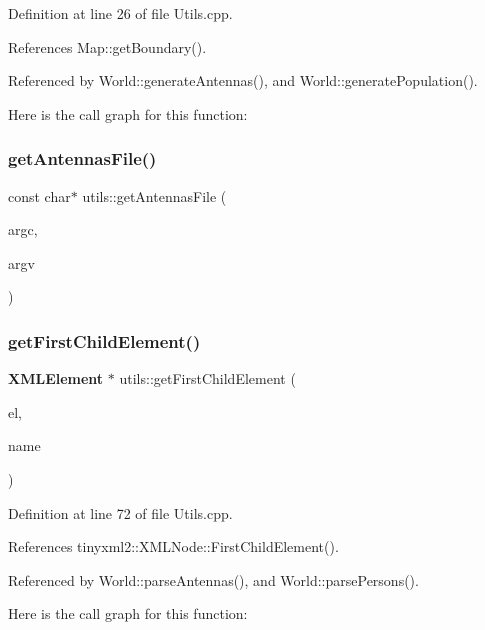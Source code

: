 Definition at line 26 of file Utils.\+cpp.



References Map\+::get\+Boundary().



Referenced by World\+::generate\+Antennas(), and World\+::generate\+Population().

Here is the call graph for this function\+:
\mbox{\label{namespaceutils_a20d2148f668eec93d623536d18c7dd62}} 
\subsubsection{get\+Antennas\+File()}
{\footnotesize\ttfamily const char$\ast$ utils\+::get\+Antennas\+File (\begin{DoxyParamCaption}\item[{int}]{argc,  }\item[{char $\ast$$\ast$}]{argv }\end{DoxyParamCaption})}

\mbox{\label{namespaceutils_a6d3da5ad06700408fa8e41f3115e4c40}} 
\subsubsection{get\+First\+Child\+Element()}
{\footnotesize\ttfamily \textbf{ X\+M\+L\+Element} $\ast$ utils\+::get\+First\+Child\+Element (\begin{DoxyParamCaption}\item[{\textbf{ X\+M\+L\+Element} $\ast$}]{el,  }\item[{const char $\ast$}]{name }\end{DoxyParamCaption})\hspace{0.3cm}{\ttfamily [noexcept]}}



Definition at line 72 of file Utils.\+cpp.



References tinyxml2\+::\+X\+M\+L\+Node\+::\+First\+Child\+Element().



Referenced by World\+::parse\+Antennas(), and World\+::parse\+Persons().

Here is the call graph for this function\+:
\mbox{\label{namespaceutils_a7fb4a9700e2a1e31cca50ef090bf4b05}} 

